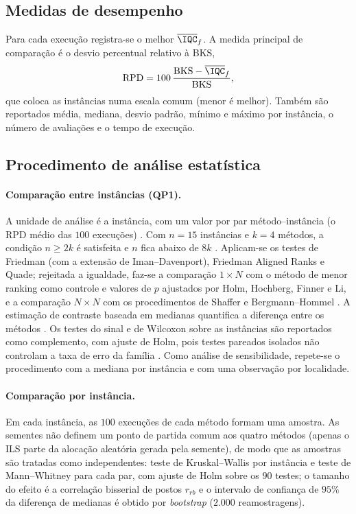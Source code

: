

\subsection{Medidas de desempenho}

Para cada execução registra-se o melhor $\overline{\IQC}_f$. A medida principal de comparação é o
desvio percentual relativo à BKS,
\begin{equation}
\mathrm{RPD} = 100\,\frac{\mathrm{BKS}-\overline{\IQC}_f}{\mathrm{BKS}},
\end{equation}
que coloca as instâncias numa escala comum (menor é melhor). Também são reportados média, mediana,
desvio padrão, mínimo e máximo por instância, o número de avaliações e o tempo de execução.

\subsection{Procedimento de análise estatística}

\paragraph{Comparação entre instâncias (QP1).} A unidade de análise é a instância, com um valor por par
método--instância (o RPD médio das $100$ execuções) \cite[Sec.~6.1]{derrac2011practical}. Com $n=15$
instâncias e $k=4$ métodos, a condição $n\geq 2k$ é satisfeita e $n$ fica abaixo de $8k$
\cite[Sec.~6.1]{derrac2011practical}. Aplicam-se os testes de Friedman (com a extensão de
Iman--Davenport), Friedman Aligned Ranks e Quade; rejeitada a igualdade, faz-se a comparação
$1\times N$ com o método de menor ranking como controle e valores de $p$ ajustados por Holm, Hochberg,
Finner e Li, e a comparação $N\times N$ com os procedimentos de Shaffer e Bergmann--Hommel
\cite[Secs.~4.3, 5 e 6.3]{derrac2011practical}. A estimação de contraste baseada em medianas quantifica
a diferença entre os métodos \cite[Sec.~4.4]{derrac2011practical}. Os testes do sinal e de Wilcoxon
sobre as instâncias são reportados como complemento, com ajuste de Holm, pois testes pareados isolados
não controlam a taxa de erro da família \cite[Sec.~4]{derrac2011practical}. Como análise de
sensibilidade, repete-se o procedimento com a mediana por instância e com uma observação por localidade.

\paragraph{Comparação por instância.} Em cada instância, as $100$ execuções de cada método formam uma
amostra. As sementes não definem um ponto de partida comum aos quatro métodos (apenas o ILS parte da
alocação aleatória gerada pela semente), de modo que as amostras são tratadas como independentes:
teste de Kruskal--Wallis por instância e teste de Mann--Whitney para cada par, com ajuste de Holm sobre
os $90$ testes; o tamanho do efeito é a correlação bisserial de postos $r_{rb}$ e o intervalo de
confiança de $95\%$ da diferença de medianas é obtido por \textit{bootstrap} ($2.000$ reamostragens).

